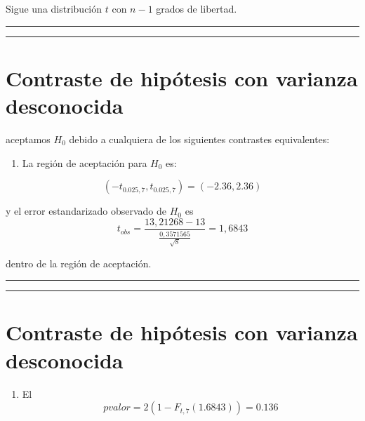 \documentclass[
]{book}
\providecommand{\tightlist}{%
  \setlength{\itemsep}{0pt}\setlength{\parskip}{0pt}}
\begin{document}
Sigue una distribución \(t\) con \(n-1\) grados de libertad.

\begin{center}\rule{0.5\linewidth}{0.5pt}\end{center}

\begin{center}\rule{0.5\linewidth}{0.5pt}\end{center}

\hypertarget{contraste-de-hipuxf3tesis-con-varianza-desconocida}{%
\section{Contraste de hipótesis con varianza desconocida}\label{contraste-de-hipuxf3tesis-con-varianza-desconocida}}

aceptamos \(H_0\) debido a cualquiera de los siguientes contrastes equivalentes:

\begin{enumerate}
\def\labelenumi{\arabic{enumi}.}
\tightlist
\item
  La región de aceptación para \(H_0\) es:
\end{enumerate}

\[(-t_{0.025,7}, t_{0.025,7})=( -2.36, 2.36)\]

y el error estandarizado observado de \(H_0\) es
\[t_{obs} = \frac{13,21268-13}{\frac{0,3571565}{\sqrt{8}}}=1,6843\]

dentro de la región de aceptación.

\begin{center}\rule{0.5\linewidth}{0.5pt}\end{center}

\begin{center}\rule{0.5\linewidth}{0.5pt}\end{center}

\hypertarget{contraste-de-hipuxf3tesis-con-varianza-desconocida-1}{%
\section{Contraste de hipótesis con varianza desconocida}\label{contraste-de-hipuxf3tesis-con-varianza-desconocida-1}}

\begin{enumerate}
\def\labelenumi{\arabic{enumi}.}
\setcounter{enumi}{1}
\tightlist
\item
  El \[pvalor=2(1-F_{t,7}(1.6843))=0.136\]
\end{enumerate}
\end{document}

